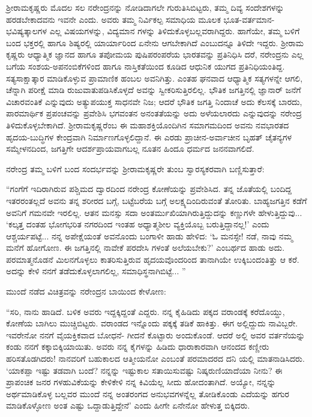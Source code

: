 ಶ್ರೀರಾಮಕೃಷ್ಣರು ಮೊದಲ ಸಲ ನರೇಂದ್ರನನ್ನು ನೋಡಿದಾಗಲೇ ಗುರುತಿಸಿಬಿಟ್ಟರು, ತಮ್ಮ ದಿವ್ಯ ಸಂದೇಶಗಳನ್ನು ಹರಡಬೇಕಾದವನು ಇವನೇ ಎಂದು. ಅವರು ತಮ್ಮ ನಿರ್ವಿಕಲ್ಪ ಸಮಾಧಿಯ ಮೂಲಕ ಭೂತ-ವರ್ತಮಾನ-ಭವಿಷ್ಯತ್ಕಾಲಗಳ ಎಲ್ಲ ವಿಷಯಗಳನ್ನು, ವಿದ್ಯಮಾನ ಗಳನ್ನು ತಿಳಿದುಕೊಳ್ಳಬಲ್ಲವರಾಗಿದ್ದರು. ಹಾಗೆಯೇ, ತಮ್ಮ ಬಳಿಗೆ ಬಂದ ಭಕ್ತರಲ್ಲಿ ಹಾಗೂ ಶಿಷ್ಯರಲ್ಲಿ ಯಾರ್ಯಾರಿಂದ ಏನೇನು ಆಗಬೇಕಾಗಿದೆ ಎಂಬುದನ್ನೂ ತಿಳಿದೇ ಇದ್ದರು. ಶ್ರೀರಾಮ ಕೃಷ್ಣರು ಆಧ್ಯಾತ್ಮಿಕ ಜ್ಞಾನದ ಹಾಗೂ ತಪೋಮಯ ಪುಷಿಪರಂಪರೆಯ ಭಾರತವನ್ನು ಪ್ರತಿನಿಧಿಸಿ ದರೆ, ನರೇಂದ್ರನು ಎಲ್ಲ ಬಗೆಯ ಸಂಶಯ-ಅಪನಂಬಿಕೆಗಳಿಂದ ಹಾಗೂ ನಾಸ್ತಿಕತೆಯಿಂದ ಕೂಡಿದ ಆಧುನಿಕ ಯುಗದ ಪ್ರತಿನಿಧಿಯಂತಿದ್ದ. ಸತ್ಯಸಾಕ್ಷಾತ್ಕಾರ ಮಾಡಿಕೊಳ್ಳುವ ಪ್ರಾಮಾಣಿಕ ಹಂಬಲ ಅವನಿಗಿತ್ತು. ಎಂತಹ ಘನವಾದ ಆಧ್ಯಾತ್ಮಿಕ ಸತ್ಯಗಳನ್ನೇ ಆಗಲಿ, ಚೆನ್ನಾಗಿ ಪರೀಕ್ಷೆ ಮಾಡಿ ರುಜುವಾತುಪಡಿಸಿಕೊಳ್ಳದೆ ಅವನ್ನು ಸ್ವೀಕರಿಸುತ್ತಿರಲಿಲ್ಲ. ಭೌತಿಕ ಜಗತ್ತಿನಲ್ಲಿ ಜ್ಞಾನಾರ್ ಜನೆಗೆ ವಿಚಾರವಂತಿಕೆ ಎನ್ನುವುದು ಅತ್ಯುಪಯುಕ್ತ ಸಾಧನವೇ ನಿಜ; ಆದರೆ ಭೌತಿಕ ಜಗತ್ತಿ ನಿಂದಾಚೆ ಅದು ಕೆಲಸಕ್ಕೆ ಬಾರದು, ಪಾರಮಾರ್ಥಿಕ ಪ್ರಪಂಚವನ್ನು ಪ್ರವೇಶಿಸಿ ಭಗವಂತನ ಅನಂತತೆಯನ್ನು ಅದು ಅಳೆಯಲಾರದು ಎನ್ನುವುದನ್ನು ನರೇಂದ್ರ ತಿಳಿದುಕೊಳ್ಳಬೇಕಾಗಿದೆ. ಶ್ರೀರಾಮಕೃಷ್ಣರೆಂಬ ಈ ಮಹಾಶಕ್ತಿಯೊಂದಿಗಿನ ಸಮಾಗಮದಿಂದ ಅವನು ನವಭಾರತದ ಹೃದಯ-ಬುದ್ಧಿಗಳ ಕೇಂದ್ರವಾಗಿ ನಿರ್ಮಾಣಗೊಳ್ಳಲಿದ್ದಾನೆ. ಈ ಎರಡು ಪ್ರಾಚೀನ-ಅರ್ವಾಚೀನ ಬೃಹತ್ ಚೈತನ್ಯಗಳ ಸಮ್ಮೇಳನದಿಂದ, ಜಗತ್ತಿಗೇ ಆದರ್ಶಪ್ರಾಯವಾಗಬಲ್ಲ ನೂತನ ಹಿಂದೂ ಧರ್ಮದ ಜನನವಾಗಲಿದೆ.

ನರೇಂದ್ರ ತಮ್ಮ ಬಳಿಗೆ ಬಂದ ಸಂದರ್ಭವನ್ನು ಶ್ರೀರಾಮಕೃಷ್ಣರೇ ತುಂಬ ಸ್ವಾರಸ್ಯಕರವಾಗಿ ಬಣ್ಣಿಸುತ್ತಾರೆ:

“ಗಂಗೆಗೆ ಇದಿರಾಗಿರುವ ಪಶ್ಚಿಮದ ದ್ವಾರದಿಂದ ನರೇಂದ್ರ ಕೋಣೆಯನ್ನು ಪ್ರವೇಶಿಸಿದ. ತನ್ನ ಜೊತೆಯಲ್ಲಿ ಬಂದಿದ್ದ ಇತರರಂತಲ್ಲದೆ ಅವನು ತನ್ನ ಶರೀರದ ಬಗ್ಗೆ, ಬಟ್ಟೆಬರೆಯ ಬಗ್ಗೆ ಅಲಕ್ಷ್ಯದಿಂದಿರುವಂತೆ ತೋರಿತು. ಬಾಹ್ಯಜಗತ್ತಿನ ಕಡೆಗೆ ಅವನಿಗೆ ಗಮನವೇ ಇರಲಿಲ್ಲ. ಆತನ ಮನಸ್ಸು ಸದಾ ಅಂತರ್ಮುಖಿಯಾಗಿರುತ್ತಿದ್ದುದನ್ನು ಕಣ್ಣುಗಳೇ ಹೇಳುತ್ತಿದ್ದುವು... ‘ಕಲ್ಕತ್ತ ದಂತಹ ಭೋಗಭರಿತ ನಗರದಿಂದ ಇಂತಹ ಅಧ್ಯಾತ್ಮಶೀಲ ವ್ಯಕ್ತಿಯೊಬ್ಬ ಬರುತ್ತಿದ್ದಾನಲ್ಲ!’ ಎಂದು ಆಶ್ಚರ್ಯಪಟ್ಟೆ... ನನ್ನ ಅಪೇಕ್ಷೆಯಂತೆ ಅವನೊಂದು ಬಂಗಾಳೀ ಹಾಡು ಹೇಳಿದ: ‘ಓ ಮನಸ್ಸೇ! ನಡೆ, ನಾವು ನಮ್ಮ ಮನೆಗೆ ಹೋಗೋಣ. ಈ ಜಗತ್ತಿನಲ್ಲಿ ನಾವೇಕೆ ಪರದೇಸಿ ಗಳಂತೆ ಅಲೆಯಬೇಕು?’ ಎಂಬರ್ಥದ ಹಾಡು ಅದು. ಪರಮಾತ್ಮನೊಡನೆ ಮಿಲನಗೊಳ್ಳಲು ಕಾತರಿಸುತ್ತಿರುವ ಹೃದಯವೊಂದರಿಂದ ತಾನಾಗಿಯೇ ಉಕ್ಕಿಬಂದಂತಿತ್ತು ಆ ಕರೆ. ಅದನ್ನು ಕೇಳಿ ನನಗೆ ತಡೆದುಕೊಳ್ಳಲಾಗಲಿಲ್ಲ, ಸಮಾಧಿಸ್ಥನಾಗಿಬಿಟ್ಟೆ... ”

ಮುಂದೆ ನಡೆದ ವಿಚಿತ್ರವನ್ನು ನರೇಂದ್ರನ ಬಾಯಿಂದ ಕೇಳೋಣ:

“ಸರಿ, ನಾನು ಹಾಡಿದೆ. ಬಳಿಕ ಅವರು ಇದ್ದಕ್ಕಿದ್ದಂತೆ ಎದ್ದರು. ನನ್ನ ಕೈಹಿಡಿದು ಪಕ್ಕದ ವರಾಂಡಕ್ಕೆ ಕರೆದೊಯ್ದು, ಕೋಣೆಯ ಬಾಗಿಲು ಮುಚ್ಚಿಬಿಟ್ಟರು. ವರಾಂಡದ ಇನ್ನೊಂದು ಪಕ್ಕಕ್ಕೆ ತಡಿಕೆ ಹಾಕಿತ್ತು. ಈಗ ಅಲ್ಲಿದ್ದುದು ನಾವಿಬ್ಬರೇ. ಇವರೇನೋ ನನಗೆ ವೈಯಕ್ತಿಕವಾದ ಬೋಧನೆ- ಗೀದನೆ ಕೊಟ್ಟಾರು ಅಂದುಕೊಂಡೆ. ಆದರೆ ಅಲ್ಲಿ ಅವರ ವರ್ತನೆಯನ್ನು ಕಂಡು ನನಗೆ ಕಕ್ಕಾಬಿಕ್ಕಿಯಾಯಿತು. ಅವರು ನನ್ನ ಕೈಗಳನ್ನು ಹಿಡಿದು ಧಾರಾಕಾರವಾಗಿ ಆನಂದದ ಕಣ್ಣೀರು ಹರಿಸತೊಡಗಿದರು! ನಾನವರಿಗೆ ಬಹುಕಾಲದ ಆತ್ಮೀಯನೋ ಎಂಬಂತೆ ಪರಮಾದರದ ದನಿ ಯಲ್ಲಿ ಮಾತನಾಡಿಸಿದರು. ‘ಯಾಕಪ್ಪಾ ಇಷ್ಟು ತಡವಾಗಿ ಬಂದೆ? ನನ್ನನ್ನು ಇಷ್ಟುಕಾಲ ಸತಾಯಿಸುವಷ್ಟು ನಿಷ್ಕರುಣಿಯಾದೆಯಾ ನೀನು? ಈ ಪ್ರಾಪಂಚಿಕ ಜನರ ಗಳಹುವಿಕೆಯನ್ನು ಕೇಳಿಕೇಳಿ ನನ್ನ ಕಿವಿಯೆಲ್ಲ ಸೀದು ಹೋದಂತಾಗಿದೆ. ಅಯ್ಯೋ, ನನ್ನನ್ನು ಅರ್ಥಮಾಡಿಕೊಳ್ಳ ಬಲ್ಲವರ ಮುಂದೆ ನನ್ನ ಅಂತರಂಗದ ಅನುಭವಗಳನ್ನೆಲ್ಲ ತೋಡಿಕೊಂಡು ಎದೆಯನ್ನು ಹಗುರ ಮಾಡಿಕೊಳ್ಳೋಣ ಅಂತ ಎಷ್ಟು ಒದ್ದಾಡುತ್ತಿದ್ದೇನೆ’ ಎಂದು ಹೀಗೇ ಏನೇನೋ ಹೇಳುತ್ತ ಬಿಕ್ಕಿದರು.

